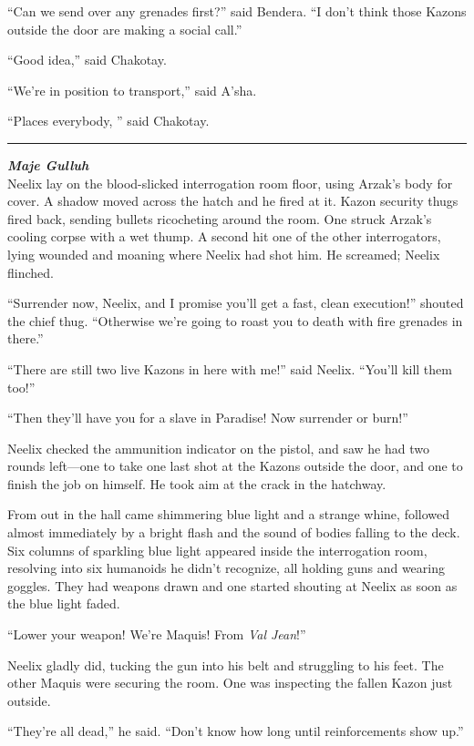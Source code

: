 \documentclass[twoside,letterpaper,12pt]{memoir}
\begin{document}
``Can we send over any grenades first?'' said Bendera. ``I don’t think those Kazons outside the door are making a social call.''

``Good idea,'' said Chakotay.

``We’re in position to transport,'' said A’sha.

``Places everybody, '' said Chakotay.

\fancybreak{\rule{3cm}{0.4 pt}}
\noindent\textit{\textbf{Maje Gulluh}}\\

Neelix lay on the blood-slicked interrogation room floor, using Arzak's body for cover. A shadow moved across the hatch and he fired at it. Kazon security thugs fired back, sending bullets ricocheting around the room. One struck Arzak’s cooling corpse with a wet thump. A second hit one of the other interrogators, lying wounded and moaning where Neelix had shot him. He screamed; Neelix flinched.

``Surrender now, Neelix, and I promise you’ll get a fast, clean execution!'' shouted the chief thug. ``Otherwise we’re going to roast you to death with fire grenades in there.''

``There are still two live Kazons in here with me!'' said Neelix. ``You’ll kill them too!''

``Then they’ll have you for a slave in Paradise! Now surrender or burn!''

Neelix checked the ammunition indicator on the pistol, and saw he had two rounds left—one to take one last shot at the Kazons outside the door, and one to finish the job on himself. He took aim at the crack in the hatchway.

From out in the hall came shimmering blue light and a strange whine, followed almost immediately by a bright flash and the sound of bodies falling to the deck. Six columns of sparkling blue light appeared inside the interrogation room, resolving into six humanoids he didn’t recognize, all holding guns and wearing goggles. They had weapons drawn and one started shouting at Neelix as soon as the blue light faded.

``Lower your weapon! We’re Maquis! From \textit{Val Jean}!''

Neelix gladly did, tucking the gun into his belt and struggling to his feet. The other Maquis were securing the room. One was inspecting the fallen Kazon just outside.

``They’re all dead,'' he said. ``Don’t know how long until reinforcements show up.''
\end{document}
